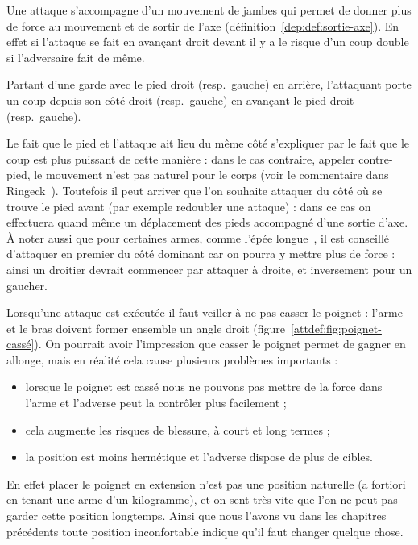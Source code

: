 
Une attaque s'accompagne d'un mouvement de jambes qui permet de donner plus de force au mouvement et de sortir de l'axe (définition~\ref{dep:def:sortie-axe}).
En effet si l'attaque se fait en avançant droit devant il y a le risque d'un coup double si l'adversaire fait de même.


\begin{coup}

Partant d'une garde avec le pied droit (resp.\ gauche) en arrière, l'attaquant porte un coup depuis son côté droit (resp.\ gauche) en avançant le pied droit (resp.\ gauche).
\end{coup}

Le fait que le pied et l'attaque ait lieu du même côté s'expliquer par le fait que le coup est plus puissant de cette manière : dans le cas contraire, appeler contre-pied, le mouvement n'est pas naturel pour le corps (voir le commentaire dans Ringeck~\cite[p.~7]{farrell:ringeck}).
Toutefois il peut arriver que l'on souhaite attaquer du côté où se trouve le pied avant (par exemple redoubler une attaque) : dans ce cas on effectuera quand même un déplacement des pieds accompagné d'une sortie d'axe.
À noter aussi que pour certaines armes, comme l'épée longue~\cite[p.~10]{farrell:ringeck}, il est conseillé d'attaquer en premier du côté dominant car on pourra y mettre plus de force : ainsi un droitier devrait commencer par attaquer à droite, et inversement pour un gaucher.

Lorsqu'une attaque est exécutée il faut veiller à ne pas casser le poignet : l'arme et le bras doivent former ensemble un angle droit (figure~\ref{attdef:fig:poignet-cassé}).
On pourrait avoir l'impression que casser le poignet permet de gagner en allonge, mais en réalité cela cause plusieurs problèmes importants :
\begin{itemize}
	\item lorsque le poignet est cassé nous ne pouvons pas mettre de la force dans l'arme et l'adverse peut la contrôler plus facilement ;
	
	\item cela augmente les risques de blessure, à court et long termes ;
	
	\item la position est moins hermétique et l'adverse dispose de plus de cibles.
\end{itemize}
En effet placer le poignet en extension n'est pas une position naturelle (a fortiori en tenant une arme d'un kilogramme), et on sent très vite que l'on ne peut pas garder cette position longtemps.
Ainsi que nous l'avons vu dans les chapitres précédents toute position inconfortable indique qu'il faut changer quelque chose.



